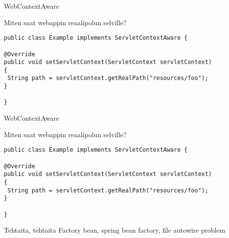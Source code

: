 \documentclass[hyperref={pdfauthor=\AUTHOR},14pt]{beamer}
\author{\AUTHOR}
\title[\TITLE]{\TITLE}
\date{\DATE}
\begin{document}
\begin{frame}[plain]
\titlepage
\end{frame}

\begin{frame}[t,fragile]{WebContextAware}

Miten saat webappin reaalipolun selville?

\lstset{language=Java,style=Java}
\begin{lstlisting}
public class Example implements ServletContextAware {

@Override
public void setServletContext(ServletContext servletContext)
{
 String path = servletContext.getRealPath("resources/foo");
}

}
\end{lstlisting}
\end{frame}

\begin{frame}[t,fragile]{WebContextAware}

Miten saat webappin reaalipolun selville?

\lstset{language=Java,style=Java}
\begin{lstlisting}
public class Example implements ServletContextAware {

@Override
public void setServletContext(ServletContext servletContext)
{
 String path = servletContext.getRealPath("resources/foo");
}

}
\end{lstlisting}
\end{frame}

\begin{frame}[t,fragile]{Tehtaita, tehtaita}
Factory bean, spring bean factory, file autowire problem
\end{frame}
\end{document}

